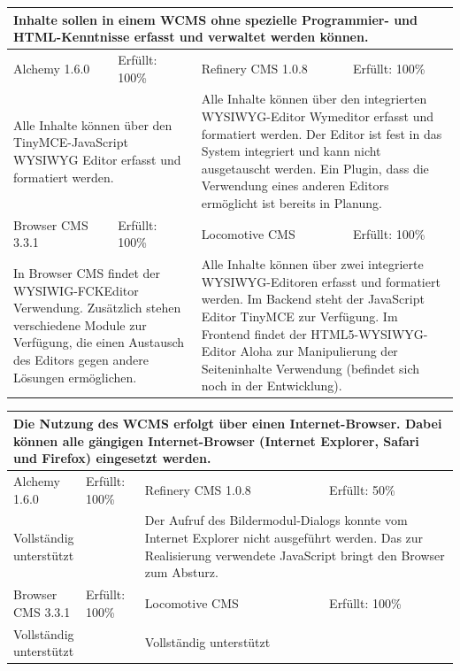 \begin{tabular}[!ht]{|l|l|l|l|}
\hline
\multicolumn{4}{|p{15cm}|}{\textbf{Inhalte sollen in einem WCMS ohne spezielle Programmier- und HTML-Kenntnisse erfasst und verwaltet werden können.}} \\
\hline
  Alchemy 1.6.0 & \cellcolor{green}Erfüllt: 100\% & Refinery CMS 1.0.8 & \cellcolor{green}Erfüllt: 100\% \\
  \hline
  \multicolumn{2}{|p{7.5cm}|}{Alle Inhalte können über den TinyMCE-JavaScript WYSIWYG Editor erfasst und formatiert werden.}
   & \multicolumn{2}{p{7.5cm}|}{Alle Inhalte können über den integrierten WYSIWYG-Editor Wymeditor erfasst und formatiert werden. Der Editor ist fest in das System integriert und kann nicht ausgetauscht werden. Ein Plugin, dass die Verwendung eines anderen Editors ermöglicht ist bereits in Planung.} \\
  \hline
  Browser CMS 3.3.1 & \cellcolor{green}Erfüllt: 100\% & Locomotive CMS & \cellcolor{green}Erfüllt: 100\% \\
  \hline
  \multicolumn{2}{|p{7.5cm}|}{In Browser CMS findet der WYSIWIG-FCKEditor Verwendung. Zusätzlich stehen verschiedene Module zur Verfügung, die einen Austausch des Editors gegen andere Lösungen ermöglichen.} & \multicolumn{2}{p{7.5cm}|}{Alle Inhalte können über zwei integrierte WYSIWYG-Editoren erfasst und formatiert werden. Im Backend steht der JavaScript Editor TinyMCE zur Verfügung. Im Frontend findet der HTML5-WYSIWYG-Editor Aloha zur Manipulierung der Seiteninhalte Verwendung (befindet sich noch in der Entwicklung).} \\
\hline
\end{tabular}
\newline
\newline
\newline
\begin{tabular}[!ht]{|l|l|l|l|}
\hline
\multicolumn{4}{|p{15cm}|}{\textbf{Die Nutzung des WCMS erfolgt über einen Internet-Browser. Dabei können alle gängigen Internet-Browser (Internet Explorer, Safari und Firefox) eingesetzt werden.}} \\
\hline
  Alchemy 1.6.0 & \cellcolor{green}Erfüllt: 100\% & Refinery CMS 1.0.8 & \cellcolor{yellow}Erfüllt: 50\% \\
  \hline
  \multicolumn{2}{|p{7.5cm}|}{Vollständig unterstützt}
   & \multicolumn{2}{p{7.5cm}|}{Der Aufruf des Bildermodul-Dialogs konnte vom Internet Explorer nicht ausgeführt werden. Das zur Realisierung verwendete JavaScript bringt den Browser zum Absturz.} \\
  \hline
  Browser CMS 3.3.1 & \cellcolor{green}Erfüllt: 100\% & Locomotive CMS & \cellcolor{green}Erfüllt: 100\% \\
  \hline
  \multicolumn{2}{|p{7.5cm}|}{Vollständig unterstützt} & \multicolumn{2}{p{7.5cm}|}{Vollständig unterstützt} \\
\hline
\end{tabular}
